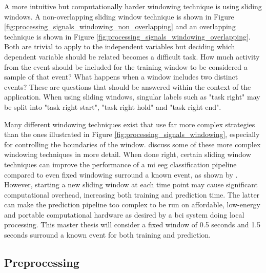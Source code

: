 A more intuitive but computationally harder windowing technique is using sliding windows.
A non-overlapping sliding window technique is shown in Figure \ref{fig:processing_signals_windowing_non_overlapping} and an overlapping technique is shown in Figure \ref{fig:processing_signals_windowing_overlapping}.
Both are trivial to apply to the independent variables but deciding which dependent variable should be related becomes a difficult task.
How much activity from the event should be included for the training window to be considered a sample of that event?
What happens when a window includes two distinct events?
These are questions that should be answered within the context of the application.
When using sliding windows, singular labels such as "task right" may be split into "task right start", "task right hold" and "task right end".

Many different windowing techniques exist that use far more complex strategies than the ones illustrated in Figure \ref{fig:processing_signals_windowing}, especially for controlling the boundaries of the window.
\citet{complex_windowing} discuss some of these more complex windowing techniques in more detail.
When done right, certain sliding window techniques can improve the performance of a \gls{mi} \gls{eeg} classification pipeline compared to even fixed windowing surround a known event, as shown by \citet{sliding_windows_better}.
However, starting a new sliding window at each time point may cause significant computational overhead, increasing both training and prediction time.
The latter can make the prediction pipeline too complex to be run on affordable, low-energy and portable computational hardware as desired by a \gls{bci} system doing local processing.
This master thesis will consider a fixed window of 0.5 seconds and 1.5 seconds surround a known event for both training and prediction.


\subsection{Preprocessing}
\label{subsec:processing_signals_general_pipeline_preprocessing}

